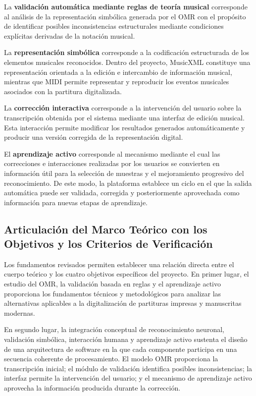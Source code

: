 \documentclass[conference]{IEEEtran}
\begin{document}
La \textbf{validación automática mediante reglas de teoría musical}
corresponde al análisis de la representación simbólica generada por el OMR
con el propósito de identificar posibles inconsistencias estructurales
mediante condiciones explícitas derivadas de la notación musical.

La \textbf{representación simbólica} corresponde a la codificación
estructurada de los elementos musicales reconocidos. Dentro del proyecto,
MusicXML constituye una representación orientada a la edición e intercambio
de información musical, mientras que MIDI permite representar y reproducir
los eventos musicales asociados con la partitura digitalizada.

La \textbf{corrección interactiva} corresponde a la intervención del usuario
sobre la transcripción obtenida por el sistema mediante una interfaz de
edición musical. Esta interacción permite modificar los resultados
generados automáticamente y producir una versión corregida de la
representación digital.

El \textbf{aprendizaje activo} corresponde al mecanismo mediante el cual las
correcciones e interacciones realizadas por los usuarios se convierten en
información útil para la selección de muestras y el mejoramiento progresivo
del reconocimiento. De este modo, la plataforma establece un ciclo en el
que la salida automática puede ser validada, corregida y posteriormente
aprovechada como información para nuevas etapas de aprendizaje.

\subsection{Articulación del Marco Teórico con los Objetivos y los Criterios de Verificación}

Los fundamentos revisados permiten establecer una relación directa entre el
cuerpo teórico y los cuatro objetivos específicos del proyecto. En
primer lugar, el estudio del OMR, la validación basada en reglas y el
aprendizaje activo proporciona los fundamentos técnicos y metodológicos para
analizar las alternativas aplicables a la digitalización de partituras
impresas y manuscritas modernas.

En segundo lugar, la integración conceptual de reconocimiento neuronal,
validación simbólica, interacción humana y aprendizaje activo sustenta el
diseño de una arquitectura de software en la que cada componente participa
en una secuencia coherente de procesamiento. El modelo OMR proporciona la
transcripción inicial; el módulo de validación identifica posibles
inconsistencias; la interfaz permite la intervención del usuario; y el
mecanismo de aprendizaje activo aprovecha la información producida durante
la corrección.
\end{document}
